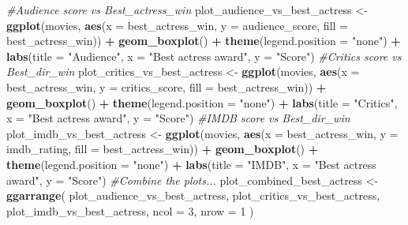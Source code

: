 \documentclass[]{article}
\newenvironment{Shaded}{\begin{snugshade}}{\end{snugshade}}
\newcommand{\KeywordTok}[1]{\textcolor[rgb]{0.13,0.29,0.53}{\textbf{#1}}}
\newcommand{\DataTypeTok}[1]{\textcolor[rgb]{0.13,0.29,0.53}{#1}}
\newcommand{\DecValTok}[1]{\textcolor[rgb]{0.00,0.00,0.81}{#1}}
\newcommand{\StringTok}[1]{\textcolor[rgb]{0.31,0.60,0.02}{#1}}
\newcommand{\CommentTok}[1]{\textcolor[rgb]{0.56,0.35,0.01}{\textit{#1}}}
\newcommand{\OperatorTok}[1]{\textcolor[rgb]{0.81,0.36,0.00}{\textbf{#1}}}
\newcommand{\NormalTok}[1]{#1}
\begin{document}
\begin{Shaded}
\begin{Highlighting}[]
\CommentTok{#Audience score vs Best_actress_win}
\NormalTok{plot_audience_vs_best_actress <-}
\StringTok{  }\KeywordTok{ggplot}\NormalTok{(movies,}
         \KeywordTok{aes}\NormalTok{(}\DataTypeTok{x =}\NormalTok{ best_actress_win, }\DataTypeTok{y =}\NormalTok{ audience_score, }\DataTypeTok{fill =}\NormalTok{ best_actress_win)) }\OperatorTok{+}
\StringTok{  }\KeywordTok{geom_boxplot}\NormalTok{() }\OperatorTok{+}\StringTok{ }\KeywordTok{theme}\NormalTok{(}\DataTypeTok{legend.position =} \StringTok{"none"}\NormalTok{) }\OperatorTok{+}\StringTok{ }\KeywordTok{labs}\NormalTok{(}\DataTypeTok{title =} \StringTok{"Audience"}\NormalTok{, }\DataTypeTok{x =} \StringTok{"Best actress award"}\NormalTok{, }\DataTypeTok{y =} \StringTok{"Score"}\NormalTok{)}
\CommentTok{#Critics score vs Best_dir_win}
\NormalTok{plot_critics_vs_best_actress <-}
\StringTok{  }\KeywordTok{ggplot}\NormalTok{(movies,}
         \KeywordTok{aes}\NormalTok{(}\DataTypeTok{x =}\NormalTok{ best_actress_win, }\DataTypeTok{y =}\NormalTok{ critics_score, }\DataTypeTok{fill =}\NormalTok{ best_actress_win)) }\OperatorTok{+}
\StringTok{  }\KeywordTok{geom_boxplot}\NormalTok{() }\OperatorTok{+}\StringTok{ }\KeywordTok{theme}\NormalTok{(}\DataTypeTok{legend.position =} \StringTok{"none"}\NormalTok{) }\OperatorTok{+}\StringTok{ }\KeywordTok{labs}\NormalTok{(}\DataTypeTok{title =} \StringTok{"Critics"}\NormalTok{, }\DataTypeTok{x =} \StringTok{"Best actress award"}\NormalTok{, }\DataTypeTok{y =} \StringTok{"Score"}\NormalTok{)}
\CommentTok{#IMDB score vs Best_dir_win}
\NormalTok{plot_imdb_vs_best_actress <-}
\StringTok{  }\KeywordTok{ggplot}\NormalTok{(movies,}
         \KeywordTok{aes}\NormalTok{(}\DataTypeTok{x =}\NormalTok{ best_actress_win, }\DataTypeTok{y =}\NormalTok{ imdb_rating, }\DataTypeTok{fill =}\NormalTok{ best_actress_win)) }\OperatorTok{+}
\StringTok{  }\KeywordTok{geom_boxplot}\NormalTok{() }\OperatorTok{+}\StringTok{ }\KeywordTok{theme}\NormalTok{(}\DataTypeTok{legend.position =} \StringTok{"none"}\NormalTok{) }\OperatorTok{+}\StringTok{ }\KeywordTok{labs}\NormalTok{(}\DataTypeTok{title =} \StringTok{"IMDB"}\NormalTok{, }\DataTypeTok{x =} \StringTok{"Best actress award"}\NormalTok{, }\DataTypeTok{y =} \StringTok{"Score"}\NormalTok{)}
\CommentTok{#Combine the plots...}
\NormalTok{plot_combined_best_actress <-}
\StringTok{  }\KeywordTok{ggarrange}\NormalTok{(}
\NormalTok{    plot_audience_vs_best_actress,}
\NormalTok{    plot_critics_vs_best_actress,}
\NormalTok{    plot_imdb_vs_best_actress,}
    \DataTypeTok{ncol =} \DecValTok{3}\NormalTok{,}
    \DataTypeTok{nrow =} \DecValTok{1}
\NormalTok{  )}
\end{Highlighting}
\end{Shaded}
\end{document}

